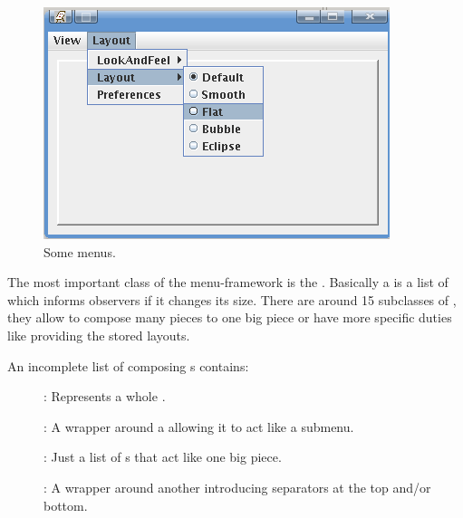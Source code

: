 \begin{figure}[ht]
\centering
\includegraphics[scale=1]{effects/menus}
\caption{Some menus.}
\label{fig:menus}
\end{figure}

The most important class of the menu-framework is the . Basically a  is a list of  which informs observers if it changes its size. There are around 15 subclasses of , they allow to compose many pieces to one big piece or have more specific duties like providing the stored layouts.

An incomplete list of composing s contains:
\begin{description}
 \item []: Represents a whole .
 \item []: A wrapper around a  allowing it to act like a submenu.
 \item []: Just a list of s that act like one big piece.
 \item []: A wrapper around another  introducing separators at the top and/or bottom.
\end{description}


